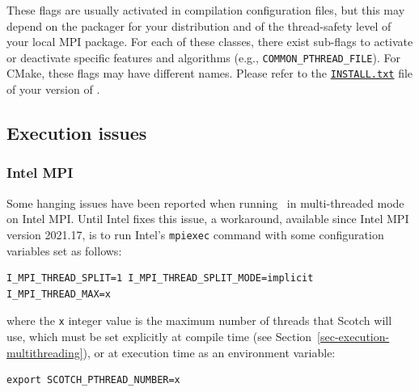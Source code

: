 These flags are usually activated in compilation configuration files,
but this may depend on the packager for your distribution and of the
thread-safety level of your local MPI package. For each of these
classes, there exist sub-flags to activate or deactivate specific
features and algorithms (e.g.,
\texttt{COMMON\_\lbt PTHREAD\_\lbt FILE}). For CMake, these flags may
have different names. Please refer to the
\href{https://gitlab.inria.fr/scotch/scotch/-/blob/master/INSTALL.txt}{\texttt{INSTALL.txt}}
file of your version of \scotch.

\begin{center}
\end{center}

\subsection{Execution issues}
\label{sec-execution-issues}

\subsubsection{Intel MPI}

Some hanging issues have been reported when running \ptscotch\ in
multi-threaded mode on Intel MPI. Until Intel fixes this issue, a
workaround, available since Intel MPI version 2021.17, is to run
Intel's \texttt{mpiexec} command with some configuration variables set
as follows:

\begin{lstlisting}[style=language-b]
I_MPI_THREAD_SPLIT=1 I_MPI_THREAD_SPLIT_MODE=implicit I_MPI_THREAD_MAX=x
\end{lstlisting}

\noi
where the \texttt{x} integer value is the maximum number of threads
that Scotch will use, which must be set explicitly at compile time
(see Section~\ref{sec-execution-multithreading}), or
at execution time as an environment variable:

\begin{lstlisting}[style=language-b]
export SCOTCH_PTHREAD_NUMBER=x
\end{lstlisting}
